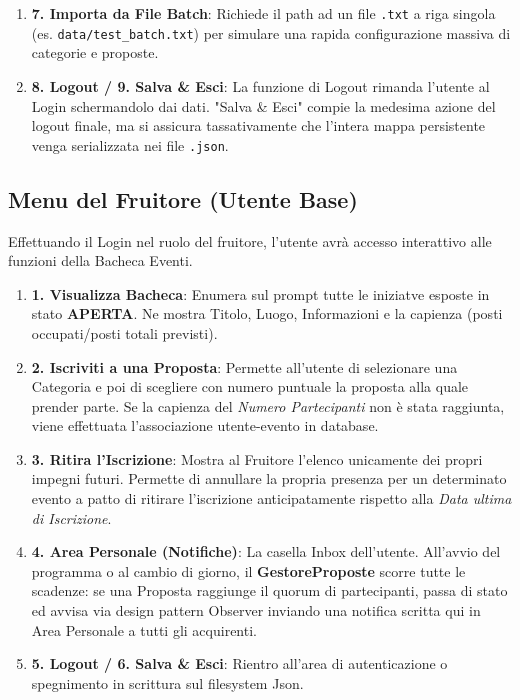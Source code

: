 \begin{enumerate}
\begin{itemize}
    \end{itemize}
    \item \textbf{7. Importa da File Batch}: Richiede il path ad un file \texttt{.txt} a riga singola (es. \texttt{data/test\_batch.txt}) per simulare una rapida configurazione massiva di categorie e proposte.
    \item \textbf{8. Logout / 9. Salva \& Esci}: La funzione di Logout rimanda l'utente al Login schermandolo dai dati. "Salva \& Esci" compie la medesima azione del logout finale, ma si assicura tassativamente che l'intera mappa persistente venga serializzata nei file \texttt{.json}.
\end{enumerate}

\subsection{Menu del Fruitore (Utente Base)}
Effettuando il Login nel ruolo del fruitore, l'utente avrà accesso interattivo alle funzioni della Bacheca Eventi.

\begin{enumerate}
    \item \textbf{1. Visualizza Bacheca}: Enumera sul prompt tutte le iniziatve esposte in stato \textbf{APERTA}. Ne mostra Titolo, Luogo, Informazioni e la capienza (posti occupati/posti totali previsti).
    \item \textbf{2. Iscriviti a una Proposta}: Permette all'utente di selezionare una Categoria e poi di scegliere con numero puntuale la proposta alla quale prender parte. Se la capienza del \textit{Numero Partecipanti} non è stata raggiunta, viene effettuata l'associazione utente-evento in database.
    \item \textbf{3. Ritira l'Iscrizione}: Mostra al Fruitore l'elenco unicamente dei propri impegni futuri. Permette di annullare la propria presenza per un determinato evento a patto di ritirare l'iscrizione anticipatamente rispetto alla \textit{Data ultima di Iscrizione}.
    \item \textbf{4. Area Personale (Notifiche)}: La casella Inbox dell'utente. All'avvio del programma o al cambio di giorno, il \textbf{GestoreProposte} scorre tutte le scadenze: se una Proposta raggiunge il quorum di partecipanti, passa di stato ed avvisa via design pattern Observer inviando una notifica scritta qui in Area Personale a tutti gli acquirenti.
    \item \textbf{5. Logout / 6. Salva \& Esci}: Rientro all'area di autenticazione o spegnimento in scrittura sul filesystem Json.
\end{enumerate}
